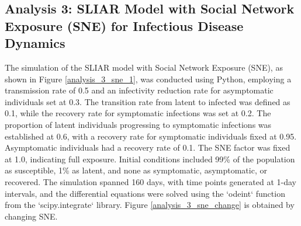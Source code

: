 \documentclass[9 pt]{article} %
\begin{document}
\subsection{Analysis 3: SLIAR Model with Social Network Exposure (SNE) for Infectious Disease Dynamics}

The simulation of the SLIAR model with Social Network Exposure (SNE), as shown in Figure \ref{analysis_3_sne_1}, was conducted using Python, employing a transmission rate of 0.5 and an infectivity reduction rate for asymptomatic individuals set at 0.3. The transition rate from latent to infected was defined as 0.1, while the recovery rate for symptomatic infections was set at 0.2. The proportion of latent individuals progressing to symptomatic infections was established at 0.6, with a recovery rate for symptomatic individuals fixed at 0.95. Asymptomatic individuals had a recovery rate of 0.1. The SNE factor was fixed at 1.0, indicating full exposure. Initial conditions included 99\% of the population as susceptible, 1\% as latent, and none as symptomatic, asymptomatic, or recovered. The simulation spanned 160 days, with time points generated at 1-day intervals, and the differential equations were solved using the `odeint` function from the `scipy.integrate` library. Figure \ref{analysis_3_sne_change} is obtained by changing SNE. 
\end{document}
